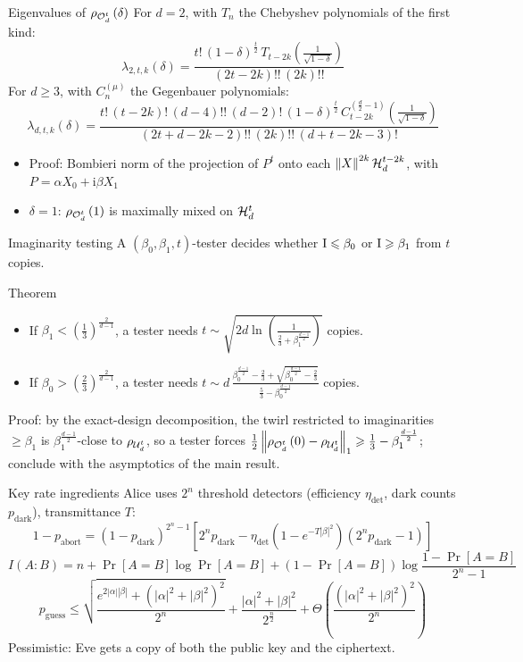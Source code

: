 \documentclass[aspectratio=169]{beamer}
\begin{document}
\begin{frame}{Eigenvalues of $\rho_{\mathcal{O}_{d}^{t}}\left(\delta\right)$}
	For $d=2$, with $T_n$ the Chebyshev polynomials of the first kind:
	\[\lambda_{2,t,k}(\delta)=\frac{t!\,(1-\delta)^{\frac t2}\,T_{t-2k}\left(\frac{1}{\sqrt{1-\delta}}\right)}{(2t-2k)!!\,(2k)!!}\]
	For $d\geqslant3$, with $C_n^{(\mu)}$ the Gegenbauer polynomials:
	\[\lambda_{d,t,k}(\delta)=\frac{t!\,(t-2k)!\,(d-4)!!\,(d-2)!\,(1-\delta)^{\frac t2}\,C_{t-2k}^{\left(\frac d2-1\right)}\left(\frac{1}{\sqrt{1-\delta}}\right)}{(2t+d-2k-2)!!\,(2k)!!\,(d+t-2k-3)!}\]
	\begin{itemize}
		\item Proof: Bombieri norm of the projection of $P^t$ onto each $\left\|X\right\|^{2k}\mathcal{H}_{d}^{t-2k}$, with $P=\alpha X_0+\mathrm{i}\beta X_1$
		\item $\delta=1$: $\rho_{\mathcal{O}_{d}^{t}}\left(1\right)$ is maximally mixed on $\mathcal{H}_{d}^{t}$
	\end{itemize}
\end{frame}

\begin{frame}{Imaginarity testing}
	A $\left(\beta_0,\beta_1,t\right)$-tester decides whether $\operatorname{I}\leqslant\beta_0$ or $\operatorname{I}\geqslant\beta_1$ from $t$ copies.
	\begin{block}{Theorem}
		\begin{itemize}
			\item If $\beta_1<\left(\frac13\right)^{\frac{2}{d-1}}$, a tester needs $t\sim\sqrt{2d\ln\left(\frac{1}{\frac23+\beta_1^{\frac{d-1}{2}}}\right)}$ copies.
			\item If $\beta_0>\left(\frac23\right)^{\frac{2}{d-1}}$, a tester needs $t\sim d\,\frac{\beta_0^{\frac{d-1}{2}}-\frac23+\sqrt{\beta_0^{\frac{d-1}{2}}-\frac23}}{\frac53-\beta_0^{\frac{d-1}{2}}}$ copies.
		\end{itemize}
	\end{block}
	Proof: by the exact-design decomposition, the twirl restricted to imaginarities $\geqslant\beta_1$ is $\beta_1^{\frac{d-1}{2}}$-close to $\rho_{\mathcal{U}_{d}^{t}}$, so a tester forces $\frac12\left\|\rho_{\mathcal{O}_{d}^{t}}\left(0\right)-\rho_{\mathcal{U}_{d}^{t}}\right\|_1\geqslant\frac13-\beta_1^{\frac{d-1}{2}}$; conclude with the asymptotics of the main result.
\end{frame}

\begin{frame}{Key rate ingredients}
	Alice uses $2^n$ threshold detectors (efficiency $\eta_{\text{det}}$, dark counts $p_{\text{dark}}$), transmittance $T$:
	\[1-p_{\text{abort}}=\left(1-p_{\text{dark}}\right)^{2^n-1}\left[2^np_{\text{dark}}-\eta_{\text{det}}\left(1-e^{-T|\beta|^2}\right)\left(2^np_{\text{dark}}-1\right)\right]\]
	\[I(A:B)=n+\Pr[A=B]\log\Pr[A=B]+\left(1-\Pr[A=B]\right)\log\frac{1-\Pr[A=B]}{2^n-1}\]
	\[p_{\text{guess}}\leqslant\sqrt{\frac{e^{2|\alpha||\beta|}+\left(|\alpha|^2+|\beta|^2\right)^2}{2^n}}+\frac{|\alpha|^2+|\beta|^2}{2^{\frac n2}}+\Theta\left(\frac{\left(|\alpha|^2+|\beta|^2\right)^2}{2^n}\right)\]
	Pessimistic: Eve gets a copy of both the public key and the ciphertext.
\end{frame}
\end{document}

